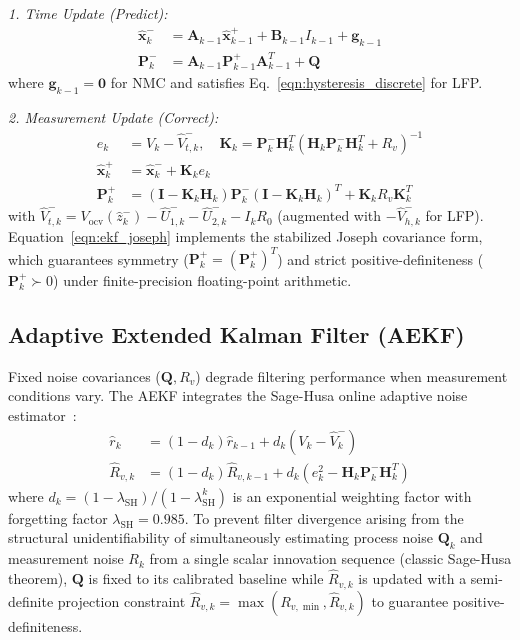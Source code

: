 \documentclass[preprint,12pt]{elsarticle}
\begin{document}
\emph{1. Time Update (Predict):}
\begin{align}
\hat{\mathbf{x}}_k^- &= \mathbf{A}_{k-1} \hat{\mathbf{x}}_{k-1}^+ + \mathbf{B}_{k-1} I_{k-1} + \mathbf{g}_{k-1} \label{eqn:ekf_pred_state}\\
\mathbf{P}_k^- &= \mathbf{A}_{k-1} \mathbf{P}_{k-1}^+ \mathbf{A}_{k-1}^T + \mathbf{Q} \label{eqn:ekf_pred_cov}
\end{align}
where $\mathbf{g}_{k-1} = \mathbf{0}$ for NMC and satisfies Eq.~\eqref{eqn:hysteresis_discrete} for LFP.

\emph{2. Measurement Update (Correct):}
\begin{align}
e_k &= V_k - \hat{V}_{t,k}^-, \quad \mathbf{K}_k = \mathbf{P}_k^- \mathbf{H}_k^T \left( \mathbf{H}_k \mathbf{P}_k^- \mathbf{H}_k^T + R_v \right)^{-1} \label{eqn:ekf_gain}\\
\hat{\mathbf{x}}_k^+ &= \hat{\mathbf{x}}_k^- + \mathbf{K}_k e_k \label{eqn:ekf_upd_state}\\
\mathbf{P}_k^+ &= (\mathbf{I} - \mathbf{K}_k \mathbf{H}_k) \mathbf{P}_k^- (\mathbf{I} - \mathbf{K}_k \mathbf{H}_k)^T + \mathbf{K}_k R_v \mathbf{K}_k^T \label{eqn:ekf_joseph}
\end{align}
with $\hat{V}_{t,k}^- = V_{\text{ocv}}(\hat{z}_k^-) - \hat{U}_{1,k}^- - \hat{U}_{2,k}^- - I_k R_0$ (augmented with $-\hat{V}_{h,k}^-$ for LFP). Equation~\eqref{eqn:ekf_joseph} implements the stabilized Joseph covariance form, which guarantees symmetry ($\mathbf{P}_k^+ = (\mathbf{P}_k^+)^T$) and strict positive-definiteness ($\mathbf{P}_k^+ \succ 0$) under finite-precision floating-point arithmetic.

\subsection{Adaptive Extended Kalman Filter (AEKF)}
Fixed noise covariances ($\mathbf{Q}, R_v$) degrade filtering performance when measurement conditions vary. The AEKF integrates the Sage-Husa online adaptive noise estimator~\cite{Han2019aekf}:
\begin{align}
\hat{r}_k &= (1 - d_k)\hat{r}_{k-1} + d_k \left( V_k - \hat{V}_k^- \right) \label{eqn:sh_mean}\\
\hat{R}_{v,k} &= (1 - d_k)\hat{R}_{v,k-1} + d_k \left( e_k^2 - \mathbf{H}_k \mathbf{P}_k^- \mathbf{H}_k^T \right) \label{eqn:sh_meas_cov}
\end{align}
where $d_k = (1 - \lambda_{\text{SH}}) / (1 - \lambda_{\text{SH}}^{k})$ is an exponential weighting factor with forgetting factor $\lambda_{\text{SH}} = 0.985$. To prevent filter divergence arising from the structural unidentifiability of simultaneously estimating process noise $\mathbf{Q}_k$ and measurement noise $R_k$ from a single scalar innovation sequence (classic Sage-Husa theorem), $\mathbf{Q}$ is fixed to its calibrated baseline while $\hat{R}_{v,k}$ is updated with a semi-definite projection constraint $\hat{R}_{v,k} = \max(R_{v,\min}, \hat{R}_{v,k})$ to guarantee positive-definiteness.
\end{document}
